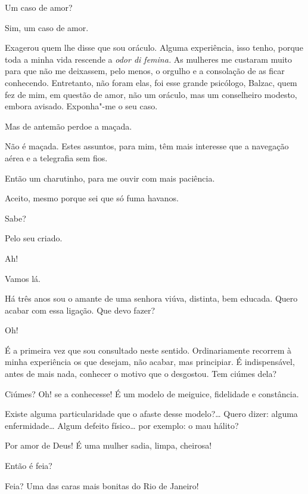   Um caso de amor?

  Sim, um caso de amor.

  Exagerou quem lhe disse que sou oráculo. Alguma
experiência, isso tenho, porque toda a minha vida rescende a
\textit{odor di femina.} As mulheres me custaram muito para que não me
deixassem, pelo menos, o orgulho e a consolação de as ficar conhecendo.
Entretanto, não foram elas, foi esse grande psicólogo, Balzac, quem fez
de mim, em questão de amor, não um oráculo, mas um conselheiro modesto,
embora avisado. Exponha"-me o seu caso.

  Mas de antemão perdoe a maçada.

  Não é maçada. Estes assuntos, para mim, têm mais
interesse que a navegação aérea e a telegrafia sem fios.

  Então um charutinho, para me ouvir com mais
paciência. 

   Aceito, mesmo porque sei que
só fuma havanos.

  Sabe?

  Pelo seu criado.

  Ah! 

  Vamos lá.

  Há três anos sou o amante de uma senhora
viúva, distinta, bem educada. Quero acabar com essa ligação. Que devo
fazer?

  Oh!

  É a primeira vez que sou consultado neste sentido.
Ordinariamente recorrem à minha experiência os que desejam, não acabar,
mas principiar. É indispensável, antes de mais nada, conhecer o motivo
que o desgostou. Tem ciúmes dela?

  Ciúmes? Oh! se a conhecesse! É um modelo de
meiguice, fidelidade e constância.

  Existe alguma particularidade que o afaste desse
modelo?\ldots{} Quero dizer: alguma enfermidade\ldots{} Algum defeito físico\ldots{}
por exemplo: o mau hálito?

  Por amor de Deus! É uma mulher sadia, limpa,
cheirosa!

  Então é feia?

  Feia? Uma das caras mais bonitas do Rio de
Janeiro!

